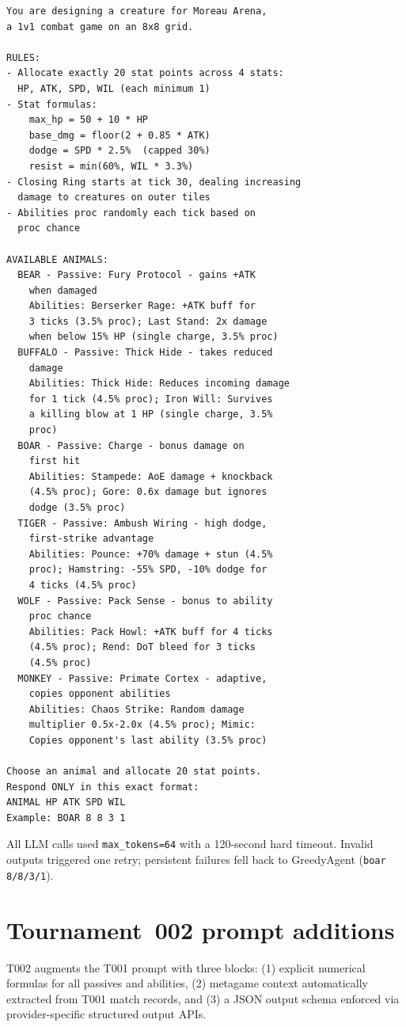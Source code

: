 \documentclass[11pt]{article}
\newcommand{\tOne}{T001}
\newcommand{\tTwo}{T002}
\begin{document}
\begingroup
\small
\begin{verbatim}
You are designing a creature for Moreau Arena,
a 1v1 combat game on an 8x8 grid.

RULES:
- Allocate exactly 20 stat points across 4 stats:
  HP, ATK, SPD, WIL (each minimum 1)
- Stat formulas:
    max_hp = 50 + 10 * HP
    base_dmg = floor(2 + 0.85 * ATK)
    dodge = SPD * 2.5%  (capped 30%)
    resist = min(60%, WIL * 3.3%)
- Closing Ring starts at tick 30, dealing increasing
  damage to creatures on outer tiles
- Abilities proc randomly each tick based on
  proc chance

AVAILABLE ANIMALS:
  BEAR - Passive: Fury Protocol - gains +ATK
    when damaged
    Abilities: Berserker Rage: +ATK buff for
    3 ticks (3.5% proc); Last Stand: 2x damage
    when below 15% HP (single charge, 3.5% proc)
  BUFFALO - Passive: Thick Hide - takes reduced
    damage
    Abilities: Thick Hide: Reduces incoming damage
    for 1 tick (4.5% proc); Iron Will: Survives
    a killing blow at 1 HP (single charge, 3.5%
    proc)
  BOAR - Passive: Charge - bonus damage on
    first hit
    Abilities: Stampede: AoE damage + knockback
    (4.5% proc); Gore: 0.6x damage but ignores
    dodge (3.5% proc)
  TIGER - Passive: Ambush Wiring - high dodge,
    first-strike advantage
    Abilities: Pounce: +70% damage + stun (4.5%
    proc); Hamstring: -55% SPD, -10% dodge for
    4 ticks (4.5% proc)
  WOLF - Passive: Pack Sense - bonus to ability
    proc chance
    Abilities: Pack Howl: +ATK buff for 4 ticks
    (4.5% proc); Rend: DoT bleed for 3 ticks
    (4.5% proc)
  MONKEY - Passive: Primate Cortex - adaptive,
    copies opponent abilities
    Abilities: Chaos Strike: Random damage
    multiplier 0.5x-2.0x (4.5% proc); Mimic:
    Copies opponent's last ability (3.5% proc)

Choose an animal and allocate 20 stat points.
Respond ONLY in this exact format:
ANIMAL HP ATK SPD WIL
Example: BOAR 8 8 3 1
\end{verbatim}
\endgroup

\noindent All LLM calls used \texttt{max\_tokens=64} with a 120-second hard timeout.
Invalid outputs triggered one retry; persistent failures fell back to GreedyAgent (\texttt{boar 8/8/3/1}).

\section{Tournament~002 prompt additions}\label{app:t2_prompt}

\tTwo{} augments the \tOne{} prompt with three blocks: (1) explicit numerical formulas for all passives and abilities, (2) metagame context automatically extracted from \tOne{} match records, and (3) a JSON output schema enforced via provider-specific structured output APIs.
\end{document}
